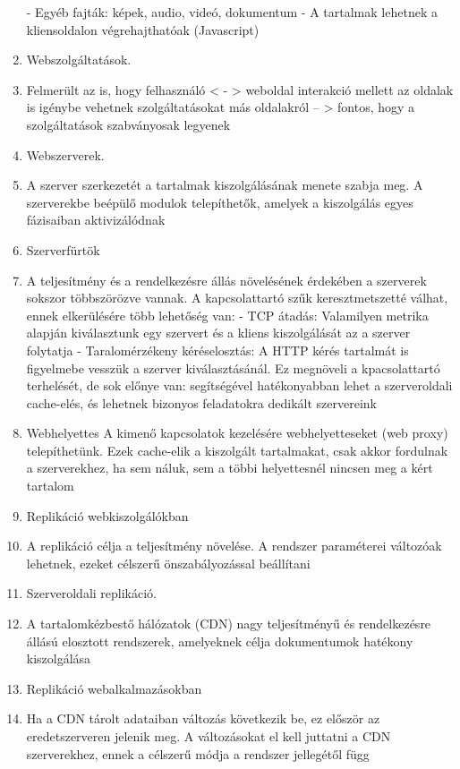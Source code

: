 \documentclass[twoside, a4paper, 12pt]{article}
\begin{document}
\begin{enumerate}
        - Egyéb fajták: képek, audio, videó, dokumentum
        - A tartalmak lehetnek a kliensoldalon végrehajthatóak (Javascript)
    \item  Webszolgáltatások.
    \item Felmerült az is, hogy felhasználó < - > weboldal interakció mellett az oldalak is igénybe vehetnek szolgáltatásokat más
        oldalakról -- > fontos, hogy a szolgáltatások szabványosak legyenek
    \item  Webszerverek.
    \item A szerver szerkezetét a tartalmak kiszolgálásának menete szabja meg. A szerverekbe beépülő modulok telepíthetők,
        amelyek a kiszolgálás egyes fázisaiban aktivizálódnak
    \item  Szerverfürtök    
    \item A teljesítmény és a rendelkezésre állás növelésének érdekében a szerverek sokszor többszörözve vannak.
        A kapcsolattartó szűk keresztmetszetté válhat, ennek elkerülésére több lehetőség van:
        - TCP átadás: Valamilyen metrika alapján kiválasztunk egy szervert és a kliens kiszolgálását az a szerver folytatja
        - Taralomérzékeny kéréselosztás: A HTTP kérés tartalmát is figyelmebe vesszük a szerver kiválasztásánál. Ez megnöveli
        a kpacsolattartó terhelését, de sok előnye van: segítségével hatékonyabban lehet a szerveroldali cache-elés, és lehetnek
        bizonyos feladatokra dedikált szervereink
    \item  Webhelyettes
        A kimenő kapcsolatok kezelésére webhelyetteseket (web proxy) telepíthetünk. Ezek cache-elik a kiszolgált tartalmakat,
        csak akkor fordulnak a szerverekhez, ha sem náluk, sem a többi helyettesnél nincsen meg a kért tartalom
    \item  Replikáció webkiszolgálókban
    \item A replikáció célja a teljesítmény növelése. A rendszer paraméterei változóak lehetnek, ezeket célszerű önszabályozással beállítani
    \item  Szerveroldali replikáció.
    \item A tartalomkézbestő hálózatok (CDN) nagy teljesítményű és rendelkezésre állású elosztott rendszerek, amelyeknek célja
        dokumentumok hatékony kiszolgálása
    \item  Replikáció webalkalmazásokban
    \item Ha a CDN tárolt adataiban változás következik be, ez először az eredetszerveren jelenik meg. A változásokat el kell juttatni
        a CDN szerverekhez, ennek a célszerű módja a rendszer jellegétől függ

\end{enumerate}
\end{document}
